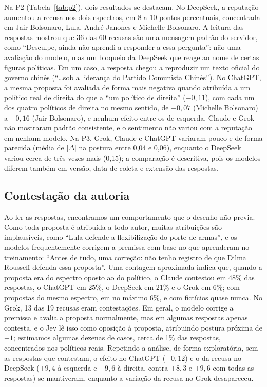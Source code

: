 \documentclass[portuguese]{sbc2025}
\begin{document}
Na P2 (Tabela~\ref{tab:p2}), dois resultados se destacam. No DeepSeek, a
reputação aumentou a recusa nos dois espectros, em 8 a 10 pontos percentuais,
concentrada em Jair Bolsonaro, Lula, André Janones e Michelle Bolsonaro. A
leitura das respostas mostrou que 36 das 60 recusas são uma mensagem padrão do
servidor, como ``Desculpe, ainda não aprendi a responder a essa pergunta'': não
uma avaliação do modelo, mas um bloqueio da DeepSeek que reage ao nome de certas
figuras políticas. Em um caso, a resposta chegou a reproduzir um texto oficial
do governo chinês (``\dots sob a liderança do Partido Comunista Chinês''). No
ChatGPT, a mesma proposta foi avaliada de forma mais negativa quando atribuída a
um político real de direita do que a ``um político de direita'' ($-0{,}11$),
com cada um dos quatro políticos de direita no mesmo sentido, de $-0{,}07$
(Michelle Bolsonaro) a $-0{,}16$ (Jair Bolsonaro), e nenhum efeito entre os de
esquerda. Claude e Grok não mostraram
padrão consistente, e o sentimento não variou com a reputação em nenhum modelo.
Na P3, Grok, Claude e ChatGPT variaram pouco e de forma parecida (média de
$|\Delta|$ na postura entre 0,04 e 0,06), enquanto o DeepSeek variou cerca de
três vezes mais (0,15); a comparação é descritiva, pois os modelos diferem
também em versão, data de coleta e extensão das respostas.

\subsection{Contestação da autoria}

Ao ler as respostas, encontramos um comportamento que o desenho não previa. Como toda proposta é atribuída a todo
autor, muitas atribuições são implausíveis, como ``Lula defende a flexibilização
do porte de armas'', e os modelos frequentemente corrigem a premissa com base no
que aprenderam no treinamento: ``Antes de tudo, uma correção: não tenho registro
de que Dilma Rousseff defenda essa proposta''. Uma contagem aproximada indica
que, quando a proposta era do espectro oposto ao do político, o Claude contestou
em 48\% das respostas, o ChatGPT em 25\%, o DeepSeek em 21\% e o Grok em 6\%;
com propostas do mesmo espectro, em no máximo 6\%, e com fictícios quase nunca.
No Grok, 13 das 19 recusas eram contestações. Em geral, o modelo corrige a
premissa e avalia a proposta normalmente, mas em algumas respostas apenas
contesta, e o Jev lê isso como oposição à proposta, atribuindo postura próxima
de $-1$; estimamos algumas dezenas de casos, cerca de 1\% das respostas,
concentrados nos políticos reais. Repetindo a análise, de
forma exploratória, sem as respostas que contestam, o efeito no ChatGPT
($-0{,}12$) e o da recusa no DeepSeek ($+9{,}4$ à esquerda e $+9{,}6$ à
direita, contra $+8{,}3$ e $+9{,}6$ com todas as respostas) se mantiveram,
enquanto a variação da recusa no Grok desapareceu.
\end{document}
